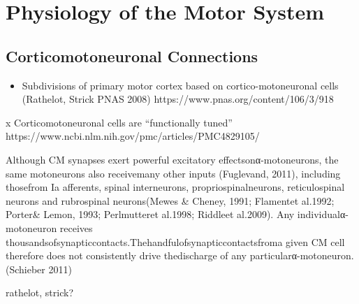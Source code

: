 {            \hypertarget{sec:physiology}{%
            \section{Physiology of the Motor
            System}\label{sec:physiology}}

            \hypertarget{corticomotoneuronal-connections}{%
            \subsection{Corticomotoneuronal
            Connections}\label{corticomotoneuronal-connections}}

            \begin{itemize}
            \tightlist
            \item
              Subdivisions of primary motor cortex based on
              cortico-motoneuronal cells (Rathelot, Strick PNAS 2008)
              https://www.pnas.org/content/106/3/918
            \end{itemize}

            x Corticomotoneuronal cells are ``functionally tuned''
            https://www.ncbi.nlm.nih.gov/pmc/articles/PMC4829105/

            Although CM synapses exert powerful excitatory
            effectsonα-motoneurons, the same motoneurons also
            receivemany other inputs (Fuglevand, 2011), including
            thosefrom Ia afferents, spinal interneurons,
            propriospinalneurons, reticulospinal neurons and rubrospinal
            neurons(Mewes \& Cheney, 1991; Flamentet al.1992; Porter\&
            Lemon, 1993; Perlmutteret al.1998; Riddleet al.2009). Any
            individualα-motoneuron receives
            thousandsofsynapticcontacts.Thehandfulofsynapticcontactsfroma
            given CM cell therefore does not consistently drive
            thedischarge of any particularα-motoneuron. (Schieber 2011)

            rathelot, strick?

}
